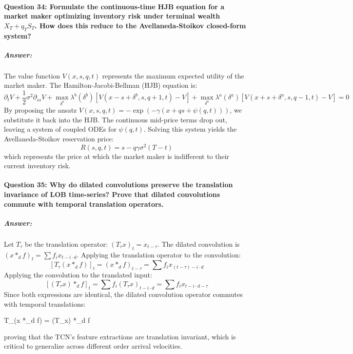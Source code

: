 \documentclass[11pt,a4paper]{article}
\begin{document}
\paragraph{Question 34: Formulate the continuous-time HJB equation for a market maker optimizing inventory risk under terminal wealth $X_T + q_T S_T$. How does this reduce to the Avellaneda-Stoikov closed-form system?}
\subparagraph{Answer:}
The value function $V(x, s, q, t)$ represents the maximum expected utility of the market maker. The Hamilton-Jacobi-Bellman (HJB) equation is:
\begin{equation}
    \partial_t V + \frac{1}{2}\sigma^2 \partial_{ss} V + \max_{\delta^b} \lambda^b(\delta^b) \left[ V(x - s + \delta^b, s, q+1, t) - V \right] + \max_{\delta^a} \lambda^a(\delta^a) \left[ V(x + s + \delta^a, s, q-1, t) - V \right] = 0
\end{equation}
By proposing the ansatz $V(x, s, q, t) = -\exp\left(-\gamma \left(x + q s + \psi(q, t)\right)\right)$, we substitute it back into the HJB. The continuous mid-price terms drop out, leaving a system of coupled ODEs for $\psi(q, t)$. Solving this system yields the Avellaneda-Stoikov reservation price:
\begin{equation}
    R(s, q, t) = s - q \gamma \sigma^2 (T - t)
\end{equation}
which represents the price at which the market maker is indifferent to their current inventory risk.

\paragraph{Question 35: Why do dilated convolutions preserve the translation invariance of LOB time-series? Prove that dilated convolutions commute with temporal translation operators.}
\subparagraph{Answer:}
Let $T_\tau$ be the translation operator: $(T_\tau x)_t = x_{t-\tau}$. The dilated convolution is $(x *_d f)_t = \sum f_i x_{t - i \cdot d}$.
Applying the translation operator to the convolution:
\begin{equation}
    \left[ T_\tau (x *_d f) \right]_t = (x *_d f)_{t-\tau} = \sum f_i x_{(t-\tau) - i \cdot d}
\end{equation}
Applying the convolution to the translated input:
\begin{equation}
    \left[ (T_\tau x) *_d f \right]_t = \sum f_i (T_\tau x)_{t - i \cdot d} = \sum f_i x_{t - i \cdot d - \tau}
\end{equation}
Since both expressions are identical, the dilated convolution operator commutes with temporal translations:
\begin{equation{}}
    T_\tau (x *_d f) = (T_\tau x) *_d f
\end{equation{}}
proving that the TCN's feature extractions are translation invariant, which is critical to generalize across different order arrival velocities.
\end{document}
